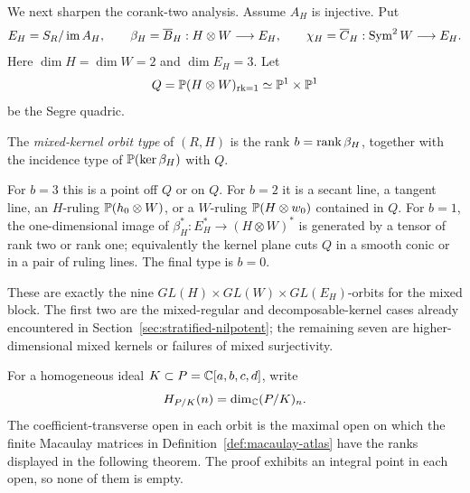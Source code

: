 We next sharpen the corank-two analysis.  Assume \(A_H\) is
injective.  Put
\[
 E_H=S_R/\operatorname{im} A_H,\qquad
 \beta_H=\overline B_H:H\otimes W\longrightarrow E_H,\qquad
 \chi_H=\overline C_H:\operatorname{Sym}^2W\longrightarrow E_H.
\]
Here \(\dim H=\dim W=2\) and \(\dim E_H=3\).  Let
\[
 Q=\mathbb P(H\otimes W)_{\operatorname{rk}=1}
   \simeq\mathbb P^1\times\mathbb P^1
\]
be the Segre quadric.

\begin{definition}
\label{def:mixed-kernel-orbit-type}
The \emph{mixed-kernel orbit type} of \((R,H)\) is the rank
\(b=\operatorname{rank}\beta_H\), together with the incidence type of
\(\mathbb P(\ker\beta_H)\) with \(Q\).

For \(b=3\) this is a point off \(Q\) or on \(Q\).  For \(b=2\)
it is a secant line, a tangent line, an \(H\)-ruling
\(\mathbb P(h_0\otimes W)\), or a \(W\)-ruling
\(\mathbb P(H\otimes w_0)\) contained in \(Q\).  For \(b=1\), the one-dimensional image of
\(\beta_H^*:E_H^*\to(H\otimes W)^*\) is generated by a tensor of
rank two or rank one; equivalently the kernel plane cuts \(Q\) in a
smooth conic or in a pair of ruling lines.  The final type is
\(b=0\).
\end{definition}

These are exactly the nine
\(GL(H)\times GL(W)\times GL(E_H)\)-orbits for the mixed block.  The
first two are the mixed-regular and decomposable-kernel cases already
encountered in Section~\ref{sec:stratified-nilpotent}; the remaining
seven are higher-dimensional mixed kernels or failures of mixed
surjectivity.

For a homogeneous ideal \(K\subset
P=\mathbb C[a,b,c,d]\), write
\[
 H_{P/K}(n)=\dim_\mathbb C(P/K)_n.
\]
The coefficient-transverse open in each orbit is the maximal open on
which the finite Macaulay matrices in
Definition~\ref{def:macaulay-atlas} have the ranks displayed in the
following theorem.  The proof exhibits an integral point in each
open, so none of them is empty.

